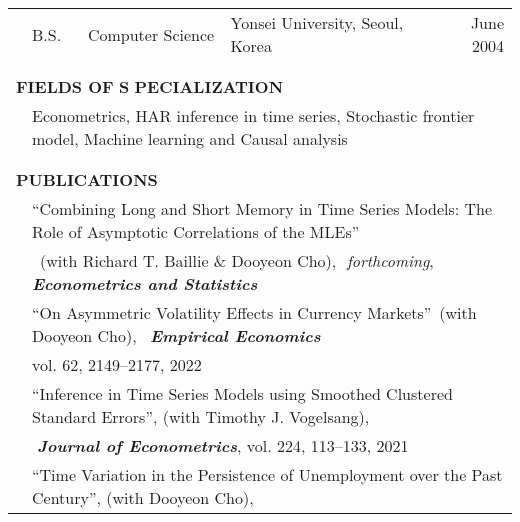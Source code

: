 \documentclass[10pt]{article}
\begin{document}
\begin{center}
\begin{tabular}{llllr}
&\multicolumn{1}{l}{B.S.} & \multicolumn{1}{l}{Computer Science}& \multicolumn{1}{l}{Yonsei University, Seoul, Korea} & \multicolumn{1}{r}{June 2004} \\
\multicolumn{5}{p{500pt}}{}\\\\
\multicolumn{5}{l}{{\Large \textbf{F}}\textbf{IELDS OF} {\Large \textbf{S}}%
\textbf{PECIALIZATION}} \vspace{0.1cm}\\
& \multicolumn{4}{l}{Econometrics, HAR inference in time series, Stochastic frontier model, Machine learning and Causal analysis} \\
\multicolumn{5}{p{500pt}}{}\\\\
\multicolumn{5}{l}{{\Large \textbf{P}}\textbf{UBLICATIONS}} \vspace{0.1cm}\\
& \multicolumn{4}{l}{\textquotedblleft Combining Long and Short Memory in Time Series Models: The Role of Asymptotic Correlations of the MLEs\textquotedblright \ } \vspace{0.1cm}\\
&\multicolumn{4}{l}{\,\,\,(with Richard T. Baillie \& Dooyeon Cho),\,\, \emph{forthcoming}, {\bf \emph{Econometrics and Statistics}} }\vspace{0.1cm}\\
& \multicolumn{4}{l}{\textquotedblleft On Asymmetric Volatility Effects in Currency Markets\textquotedblright \ (with Dooyeon Cho), \,{\bf\emph{ Empirical Economics}}}\\
& \multicolumn{4}{l}{ \quad vol. 62, 2149--2177, 2022}\vspace{0.1cm}\\
& \multicolumn{4}{l}{\textquotedblleft Inference in Time Series Models using Smoothed Clustered Standard Errors\textquotedblright, (with Timothy J. Vogelsang),}\\
 & \multicolumn{4}{l}{{\bf \emph{ \,\,Journal of Econometrics}}, vol. 224, 113--133, 2021} \vspace{0.1cm}\\
& \multicolumn{4}{l}{\textquotedblleft Time Variation in the Persistence of Unemployment over the Past Century\textquotedblright, (with Dooyeon Cho),}\\

\end{tabular}
\end{center}
\end{document}
